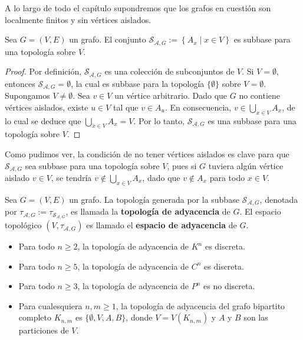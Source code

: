 A lo largo de todo el capítulo supondremos que los grafos en cuestión son localmente finitos y sin vértices aislados.
\begin{Prop}
   Sea $G=(V,E)$ un grafo. El conjunto $\mathcal{S}_{\mathcal{A},G}:=\left\lbrace A_x\mid x\in V\right\rbrace$ es subbase para una topología sobre $V$.
\end{Prop}
\begin{proof}
   Por definición, $\mathcal{S}_{\mathcal{A},G}$ es una colección de subconjuntos de $V$. Si $V = \emptyset$, entonces $\mathcal{S}_{\mathcal{A},G} = \emptyset$, la cual es subbase para la topología $\{\emptyset\}$ sobre $V = \emptyset$. Supongamos $V \neq \emptyset$. Sea $v \in V$ un vértice arbitrario. Dado que $G$ no contiene vértices aislados, existe $u \in V$ tal que $v \in A_u$. En consecuencia, $v \in \bigcup_{x \in V} A_x$, de lo cual se deduce que $\bigcup_{x \in V} A_x = V$. Por lo tanto, $\mathcal{S}_{\mathcal{A},G}$ es una subbase para una topología sobre $V$.
\end{proof}
Como pudimos ver, la condición de no tener vértices aislados es clave para que $\mathcal{S}_{\mathcal{A},G}$ sea subbase para una topología sobre $V$, pues si $G$ tuviera algún vértice aislado $v\in V$, se tendría $v\notin\bigcup_{x\in V}A_x$, dado que $v\notin A_x$ para todo $x\in V$.
\begin{Def}
   Sea $G=(V,E)$ un grafo. La topología generada por la subbase $\mathcal{S}_{\mathcal{A},G}$, denotada por $\tau_{\mathcal{A},G}:=\tau_{\mathcal{S}_{\mathcal{A},G}}$, es llamada la \textbf{topología de adyacencia} de $G$. El espacio topológico $(V,\tau_{\mathcal{A},G})$ es llamado el \textbf{espacio de adyacencia} de $G$. 
\end{Def}
\begin{Prop}\label{Prop:Calculo_topologias_adyacencia}
   \phantom{o}
   \begin{itemize}
      \item[1.] Para todo $n\ge 2$, la topología de adyacencia de $K^n$ es discreta.
      \item[2.] Para todo $n\ge 5$, la topología de adyacencia de $C^n$ es discreta.
      \item[3.] Para todo $n\ge 3$, la topología de adyacencia de $P^n$ es no discreta.
      \item[4.] Para cualesquiera $n,m\ge 1$, la topología de adyacencia del grafo bipartito completo $K_{n,m}$ es $\{\emptyset, V, A, B\}$, donde $V=V\left( K_{n,m}\right)$ y $A$ y $B$ son las particiones de $V$.
   \end{itemize}
\end{Prop}
